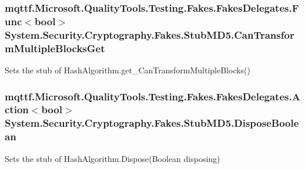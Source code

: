 \hypertarget{class_system_1_1_security_1_1_cryptography_1_1_fakes_1_1_stub_m_d5_a96473dd67d4dc787ea909376f735b693}{
\subsubsection[{Can\-Transform\-Multiple\-Blocks\-Get}]{\setlength{\rightskip}{0pt plus 5cm}mqttf.\-Microsoft.\-Quality\-Tools.\-Testing.\-Fakes.\-Fakes\-Delegates.\-Func$<$bool$>$ System.\-Security.\-Cryptography.\-Fakes.\-Stub\-M\-D5.\-Can\-Transform\-Multiple\-Blocks\-Get}}\label{class_system_1_1_security_1_1_cryptography_1_1_fakes_1_1_stub_m_d5_a96473dd67d4dc787ea909376f735b693}


Sets the stub of Hash\-Algorithm.\-get\-\_\-\-Can\-Transform\-Multiple\-Blocks()

\hypertarget{class_system_1_1_security_1_1_cryptography_1_1_fakes_1_1_stub_m_d5_a8709063d26e4504df7bd24811d4a0f43}{
\subsubsection[{Dispose\-Boolean}]{\setlength{\rightskip}{0pt plus 5cm}mqttf.\-Microsoft.\-Quality\-Tools.\-Testing.\-Fakes.\-Fakes\-Delegates.\-Action$<$bool$>$ System.\-Security.\-Cryptography.\-Fakes.\-Stub\-M\-D5.\-Dispose\-Boolean}}\label{class_system_1_1_security_1_1_cryptography_1_1_fakes_1_1_stub_m_d5_a8709063d26e4504df7bd24811d4a0f43}


Sets the stub of Hash\-Algorithm.\-Dispose(\-Boolean disposing)


